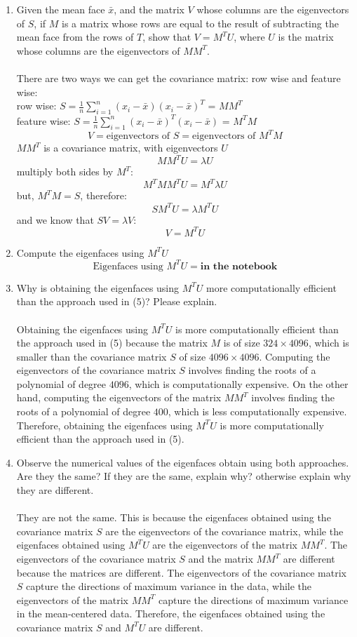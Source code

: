 \documentclass[12pt]{extarticle} %
\begin{document}
\begin{enumerate}
    \item Given the mean face \(\bar{x}\), and the matrix \(V\) whose columns are the eigenvectors of \(S\), if \(M\) is a matrix whose rows are equal to the result of subtracting the mean face from the rows of \(T\), show that \(V = M^TU\), where \(U\) is the matrix whose columns are the eigenvectors of \(MM^T\).
    \\\\ There are two ways we can get the covariance matrix: row wise and feature wise:
    \\row wise: \(S = \frac{1}{n} \sum_{i=1}^{n} (x_i - \bar{x})(x_i - \bar{x})^T\) = \(MM^T\)
    \\feature wise: \(S = \frac{1}{n} \sum_{i=1}^{n} (x_i - \bar{x})^T(x_i - \bar{x})\) = \(M^TM\)
    \[
    V = \text{eigenvectors of } S = \text{eigenvectors of } M^TM
    \]
    \(MM^T\) is a covariance matrix, with eigenvectors \(U\)
    \[
    MM^TU = \lambda U
    \]
    multiply both sides by \(M^T\):
    \[
    M^TMM^TU = M^T\lambda U
    \]
    but, \(M^TM = S\), therefore:
    \[
    SM^TU = \lambda M^TU
    \]
    and we know that \(SV=\lambda V\):
    \[
    V = M^TU
    \]
    \item Compute the eigenfaces using \(M^TU\)
    \[
    \text{Eigenfaces using } M^TU = \textbf{in the notebook}
    \]
    \item  Why is obtaining the eigenfaces using \(M^TU\) more computationally efficient than the approach used in (5)? Please explain.
    \\\\ Obtaining the eigenfaces using \(M^TU\) is more computationally efficient than the approach used in (5) because the matrix \(M\) is of size \(324 \times 4096\), which is smaller than the covariance matrix \(S\) of size \(4096 \times 4096\). Computing the eigenvectors of the covariance matrix \(S\) involves finding the roots of a polynomial of degree \(4096\), which is computationally expensive. On the other hand, computing the eigenvectors of the matrix \(MM^T\) involves finding the roots of a polynomial of degree \(400\), which is less computationally expensive. Therefore, obtaining the eigenfaces using \(M^TU\) is more computationally efficient than the approach used in (5).
    \item Observe the numerical values of the eigenfaces obtain using both approaches. Are they the same? If they are the same, explain why? otherwise explain why they are different.
    \\\\ They are not the same. This is because the eigenfaces obtained using the covariance matrix \(S\) are the eigenvectors of the covariance matrix, while the eigenfaces obtained using \(M^TU\) are the eigenvectors of the matrix \(MM^T\). The eigenvectors of the covariance matrix \(S\) and the matrix \(MM^T\) are different because the matrices are different. The eigenvectors of the covariance matrix \(S\) capture the directions of maximum variance in the data, while the eigenvectors of the matrix \(MM^T\) capture the directions of maximum variance in the mean-centered data. Therefore, the eigenfaces obtained using the covariance matrix \(S\) and \(M^TU\) are different.

\end{enumerate}
\end{document}
